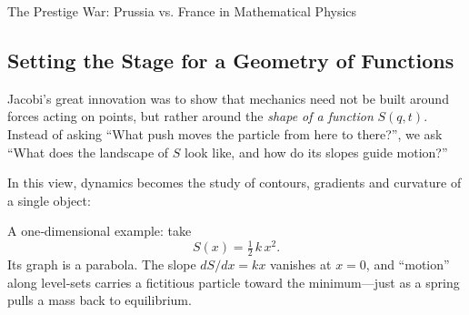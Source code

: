 \begin{HistoricalSidebar}{The Prestige War: Prussia vs. France in Mathematical Physics}
  
  
  





\subsection{Setting the Stage for a Geometry of Functions}

Jacobi’s great innovation was to show that mechanics need not be built around forces acting on points, but rather around the \emph{shape of a function} \(S(q,t)\).  Instead of asking “What push moves the particle from here to there?”, we ask “What does the landscape of \(S\) look like, and how do its slopes guide motion?”

In this view, dynamics becomes the study of contours, gradients and curvature of a single object:

  A one‐dimensional example: take 
  \[
    S(x) = \tfrac12\,k\,x^2.
  \]
  Its graph is a parabola.  The slope \(dS/dx = kx\) vanishes at \(x=0\), and “motion” along level‐sets carries a fictitious particle toward the minimum—just as a spring pulls a mass back to equilibrium.

  \begin{figure}[H]
    \centering
\end{figure}
\end{HistoricalSidebar}
